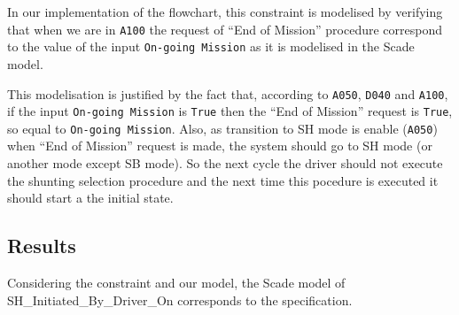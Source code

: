 In our implementation of the flowchart, this constraint is modelised
by verifying that when we are in \texttt{A100} the request of ``End of
Mission'' procedure correspond to the value of the input
\texttt{On-going Mission} as it is modelised in the Scade model.

This modelisation is justified by the fact that, according to
\texttt{A050}, \texttt{D040} and \texttt{A100}, if the input
\texttt{On-going Mission} is \texttt{True} then the ``End of Mission''
request is \texttt{True}, so equal to \texttt{On-going Mission}. Also,
as transition to SH mode is enable (\texttt{A050}) when ``End of
Mission'' request is made, the system should go to SH mode (or another
mode except SB mode). So the next cycle the driver should not execute
the shunting selection procedure and the next time this pocedure is
executed it should start a the initial state.


\subsection{Results}
Considering the constraint and our model, the Scade model of
SH\_Initiated\_By\_Driver\_On corresponds to the specification.


